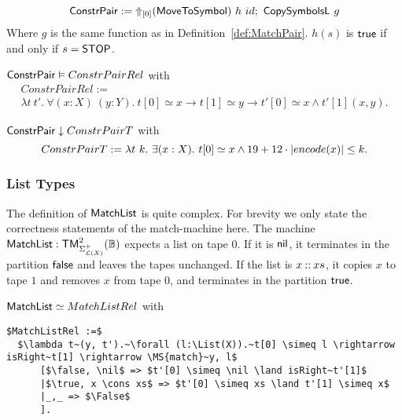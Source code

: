 \begin{definition}[$\MS{ConstrPair}$]
  \label{def:Constr_pair}
  ~
  \[
    \MS{ConstrPair} := \LiftTapes{(\MS{MoveToSymbol})}{\Vector{0}}~h~id \Seq \MS{CopySymbolsL}~g
  \]
  Where $g$ is the same function as in Definition~\ref{def:MatchPair}.  $h(s)$ is $\true$ if and only if $s=\MS{STOP}$.
\end{definition}

\begin{lemma}
  \label{lem:Constr_pair_Realise}
  $\MS{ConstrPair} \Realise ConstrPairRel$ with
  \begin{multline*}
    ConstrPairRel := \\
    \lambda t~t'.~\forall (x:X)~(y:Y).~t[0] \simeq x \rightarrow t[1] \simeq y \rightarrow t'[0] \simeq x \land t'[1] (x,y).
  \end{multline*}
\end{lemma}
\begin{lemma}
  \label{lem:Constr_pair_TerminatesIn}
  $\MS{ConstrPair} \TerminatesIn ConstrPairT$ with
  \[
    ConstrPairT := \lambda t~k.~\exists (x: X).~t[0] \simeq x \land 19 + 12 \cdot \size{x} \leq k.
  \]
\end{lemma}

\subsubsection{List Types}
\label{sec:MatchList}

The definition of $\MS{MatchList}$ is quite complex.  For brevity we only state the correctness statements of the match-machine here.  The machine
$\MS{MatchList} : \TM_{\Sigma_{\List(X)}^+}^2(\Bool)$ expects a list on tape $0$.  If it is $\nil$, it terminates in the partition $\false$ and leaves
the tapes unchanged.  If the list is $x \cons xs$, it copies $x$ to tape $1$ and removes $x$ from tape $0$, and terminates in the partition $\true$.

\begin{lemma}
  \label{lem:MatchList_Realise}
  $\MS{MatchList} \simeq MatchListRel$ with
\begin{lstlisting}[style=semicoqstyle]
$MatchListRel :=$
  $\lambda t~(y, t').~\forall (l:\List(X)).~t[0] \simeq l \rightarrow isRight~t[1] \rightarrow \MS{match}~y, l$
      [$\false, \nil$ => $t'[0] \simeq \nil \land isRight~t'[1]$
      |$\true, x \cons xs$ => $t'[0] \simeq xs \land t'[1] \simeq x$
      |_,_ => $\False$
      ].
\end{lstlisting}
\end{lemma}

